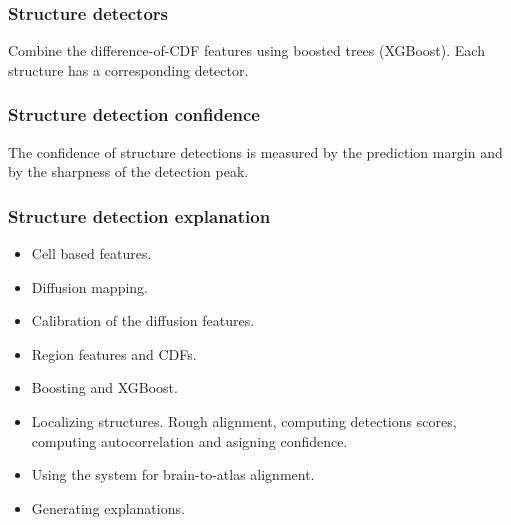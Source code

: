 \documentclass[runningheads]{llncs}
\begin{document}
\subsubsection { Structure detectors} Combine the difference-of-CDF
features using boosted trees (XGBoost). Each structure has a
corresponding detector.

\subsubsection { Structure detection confidence} The confidence of structure
  detections is measured by the prediction margin and by the sharpness
  of the detection peak.

\subsubsection { Structure detection explanation}

\begin{itemize}
\item Cell based features.
\item Diffusion mapping.
\item Calibration of the diffusion features.
\item Region features and CDFs.
\item Boosting and XGBoost.
\item Localizing structures. Rough alignment, computing detections
  scores, computing autocorrelation and asigning confidence.
\item Using the system for brain-to-atlas alignment.
\item Generating explanations.
\end{itemize}

 
 
\end{document}
